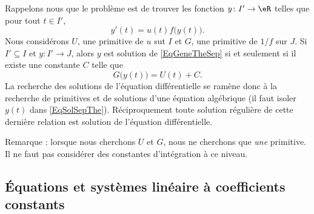 Rappelons nous que le problème est de trouver les fonction $y\colon I'\to \eR$ telles que pour tout $t \in I'$,
\begin{equation}
	y'(t)=u(t)f\big( y(t) \big).
\end{equation}
Nous considérons $U$, une primitive de $u$ sut $I$ et $G$, une primitive de $1/f$ sur $J$. Si $I'\subseteq I$ et $y\colon I'\to J$, alors $y$ est solution de \eqref{EqGeneTheSep} si et seulement si il existe une constante $C$ telle que
\begin{equation}		\label{EqSolSepThe}
	G\big( y(t) \big)=U(t)+C.
\end{equation}
La recherche des solutions de l'équation différentielle se ramène donc à la recherche de primitives et de solutions d'une équation algébrique (il faut isoler $y(t)$ dans \eqref{EqSolSepThe}). Réciproquement toute solution régulière de cette dernière relation est solution de l'équation différentielle.

Remarque : lorsque nous cherchons $U$ et $G$, nous ne cherchons que \emph{une} primitive. Il ne faut pas considérer des constantes d'intégration à ce niveau.


					\subsection{Équations et systèmes linéaire à coefficients constants}

